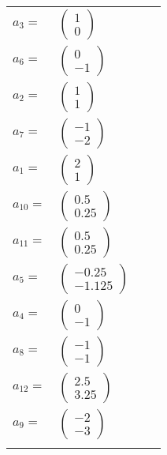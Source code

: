\documentclass[1p]{elsarticle_modified}
\theoremstyle{definition}
\begin{document}
\begin{tabular}{m{7pt} m{180pt} m{7pt} m{180pt} }
\flushright $a_{3}=$&$\begin{pmatrix}1\\0\end{pmatrix}$ \\
\flushright $a_{6}=$&$\begin{pmatrix}0\\-1\end{pmatrix}$ \\
\flushright $a_{2}=$&$\begin{pmatrix}1\\1\end{pmatrix}$ \\
\flushright $a_{7}=$&$\begin{pmatrix}-1\\-2\end{pmatrix}$ \\
\flushright $a_{1}=$&$\begin{pmatrix}2\\1\end{pmatrix}$ \\
\flushright $a_{10}=$&$\begin{pmatrix}0.5\\0.25\end{pmatrix}$ \\
\flushright $a_{11}=$&$\begin{pmatrix}0.5\\0.25\end{pmatrix}$ \\
\flushright $a_{5}=$&$\begin{pmatrix}-0.25\\-1.125\end{pmatrix}$ \\
\flushright $a_{4}=$&$\begin{pmatrix}0\\-1\end{pmatrix}$ \\
\flushright $a_{8}=$&$\begin{pmatrix}-1\\-1\end{pmatrix}$ \\
\flushright $a_{12}=$&$\begin{pmatrix}2.5\\3.25\end{pmatrix}$ \\
\flushright $a_{9}=$&$\begin{pmatrix}-2\\-3\end{pmatrix}$\\&\end{tabular}
\end{document}

